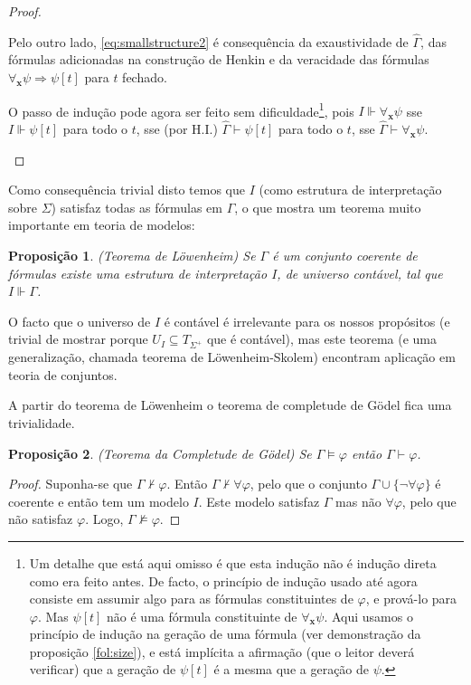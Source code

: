 \documentclass{report}
\newtheorem{prop}{Proposição}
\theoremstyle{definition}
\theoremstyle{remark}
\renewcommand{\bf}[1]{\mathbf{#1}}
\newcommand{\imply}{\mathbin{\Rightarrow}}
\begin{document}
\begin{proof}
\begin{itemize}
	Pelo outro lado, \eqref{eq:smallstructure2} é consequência da exaustividade de $\widehat \Gamma$, das fórmulas adicionadas na construção de Henkin e da veracidade das fórmulas $\forall_{\bf x} \psi \imply \psi[t]$ para $t$ fechado.

	O passo de indução pode agora ser feito sem dificuldade\footnote{Um detalhe que está aqui omisso é que esta indução não é indução direta como era feito antes. De facto, o princípio de indução usado até agora consiste em assumir algo para as fórmulas constituintes de $\varphi$, e prová-lo para $\varphi$. Mas $\psi[t]$ não é uma fórmula constituinte de $\forall_{\bf x} \psi$. Aqui usamos o princípio de indução na geração de uma fórmula (ver demonstração da proposição \ref{fol:size}), e está implícita a afirmação (que o leitor deverá verificar) que a geração de $\psi[t]$ é a mesma que a geração de $\psi$.}, pois $I \Vdash \forall_{\bf x} \psi$ sse $I \Vdash \psi[t]$ para todo o $t$, sse (por H.I.) $\widehat\Gamma \vdash \psi[t]$ para todo o $t$, sse $\widehat\Gamma \vdash \forall_{\bf x} \psi$.
	\end{itemize}
	\end{proof}

	Como consequência trivial disto temos que $I$ (como estrutura de interpretação sobre $\Sigma$) satisfaz todas as fórmulas em $\Gamma$, o que mostra um teorema muito importante em teoria de modelos:

	\begin{prop} (Teorema de Löwenheim) Se $\Gamma$ é um conjunto coerente de fórmulas existe uma estrutura de interpretação $I$, de universo contável, tal que $I \Vdash \Gamma$.
	\end{prop}

	O facto que o universo de $I$ é contável é irrelevante para os nossos propósitos (e trivial de mostrar porque $U_I \subseteq T_{\Sigma^+}$ que é contável), mas este teorema (e uma generalização, chamada teorema de Löwenheim-Skolem) encontram aplicação em teoria de conjuntos.

	A partir do teorema de Löwenheim o teorema de completude de Gödel fica uma trivialidade.

	\begin{prop} (Teorema da Completude de Gödel)
	Se $\Gamma \vDash \varphi$ então $\Gamma \vdash \varphi$.
	\end{prop}

	\begin{proof}
	Suponha-se que $\Gamma \nvdash \varphi$. Então $\Gamma \nvdash \forall \varphi$, pelo que o conjunto $\Gamma \cup \{\neg \forall \varphi\}$ é coerente e então tem um modelo $I$. Este modelo satisfaz $\Gamma$ mas não $\forall \varphi$, pelo que não satisfaz $\varphi$. Logo, $\Gamma \nvDash \varphi$.
	\end{proof}
	
\end{document}
